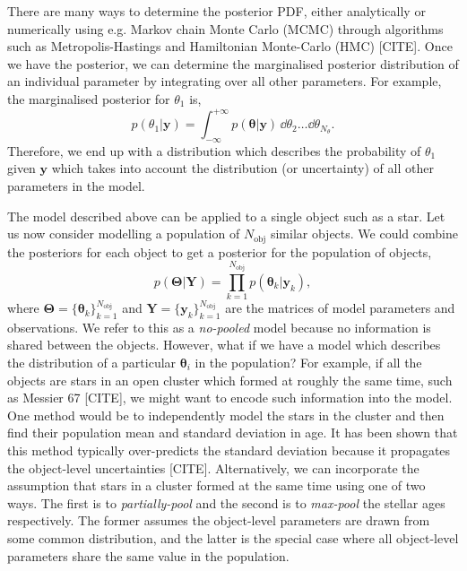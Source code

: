 There are many ways to determine the posterior PDF, either analytically or numerically using e.g. Markov chain Monte Carlo (MCMC) through algorithms such as Metropolis-Hastings and Hamiltonian Monte-Carlo (HMC) [CITE]. Once we have the posterior, we can determine the marginalised posterior distribution of an individual parameter by integrating over all other parameters. For example, the marginalised posterior for $\theta_1$ is,
%
\begin{equation}
    p(\theta_1 | \bm{y}) = \int_{-\infty}^{+\infty} p(\bm{\theta} | \bm{y}) \, \dd \theta_2 \dots \dd \theta_{N_{\theta}}.
\end{equation}
%
Therefore, we end up with a distribution which describes the probability of $\theta_1$ given $\bm{y}$ which takes into account the distribution (or uncertainty) of all other parameters in the model.

The model described above can be applied to a single object such as a star. Let us now consider modelling a population of $N_\mathrm{obj}$ similar objects. We could combine the posteriors for each object to get a posterior for the population of objects,
%
\begin{equation}
    p(\bm{\Theta}|\bm{Y}) = \prod_{k=1}^{N_\mathrm{obj}} p(\bm{\theta}_k|\bm{y}_k),
\end{equation}
%
where $\bm{\Theta} = \{\bm{\theta}_k\}_{k=1}^{N_\mathrm{obj}}$ and $\bm{Y} = \{\bm{y}_k\}_{k=1}^{N_\mathrm{obj}}$ are the matrices of model parameters and observations. We refer to this as a \emph{no-pooled} model because no information is shared between the objects. However, what if we have a model which describes the distribution of a particular $\bm{\theta}_i$ in the population? For example, if all the objects are stars in an open cluster which formed at roughly the same time, such as Messier 67 [CITE], we might want to encode such information into the model. One method would be to independently model the stars in the cluster and then find their population mean and standard deviation in age. It has been shown that this method typically over-predicts the standard deviation because it propagates the object-level uncertainties [CITE]. Alternatively, we can incorporate the assumption that stars in a cluster formed at the same time using one of two ways. The first is to \emph{partially-pool} and the second is to \emph{max-pool} the stellar ages respectively. The former assumes the object-level parameters are drawn from some common distribution, and the latter is the special case where all object-level parameters share the same value in the population.


